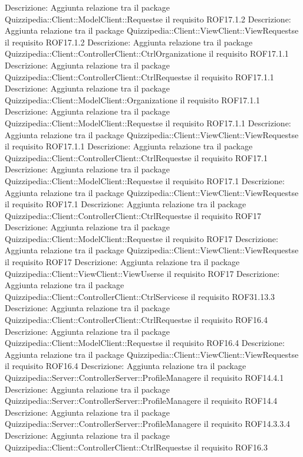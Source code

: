 Descrizione: Aggiunta relazione tra il package Quizzipedia::Client::ModelClient::Requestse il requisito ROF17.1.2 
Descrizione: Aggiunta relazione tra il package Quizzipedia::Client::ViewClient::ViewRequestse il requisito ROF17.1.2 
Descrizione: Aggiunta relazione tra il package Quizzipedia::Client::ControllerClient::CtrlOrganizatione il requisito ROF17.1.1 
Descrizione: Aggiunta relazione tra il package Quizzipedia::Client::ControllerClient::CtrlRequestse il requisito ROF17.1.1 
Descrizione: Aggiunta relazione tra il package Quizzipedia::Client::ModelClient::Organizatione il requisito ROF17.1.1 
Descrizione: Aggiunta relazione tra il package Quizzipedia::Client::ModelClient::Requestse il requisito ROF17.1.1 
Descrizione: Aggiunta relazione tra il package Quizzipedia::Client::ViewClient::ViewRequestse il requisito ROF17.1.1 
Descrizione: Aggiunta relazione tra il package Quizzipedia::Client::ControllerClient::CtrlRequestse il requisito ROF17.1 
Descrizione: Aggiunta relazione tra il package Quizzipedia::Client::ModelClient::Requestse il requisito ROF17.1 
Descrizione: Aggiunta relazione tra il package Quizzipedia::Client::ViewClient::ViewRequestse il requisito ROF17.1 
Descrizione: Aggiunta relazione tra il package Quizzipedia::Client::ControllerClient::CtrlRequestse il requisito ROF17 
Descrizione: Aggiunta relazione tra il package Quizzipedia::Client::ModelClient::Requestse il requisito ROF17 
Descrizione: Aggiunta relazione tra il package Quizzipedia::Client::ViewClient::ViewRequestse il requisito ROF17 
Descrizione: Aggiunta relazione tra il package Quizzipedia::Client::ViewClient::ViewUserse il requisito ROF17 
Descrizione: Aggiunta relazione tra il package Quizzipedia::Client::ControllerClient::CtrlServicese il requisito ROF31.13.3 
Descrizione: Aggiunta relazione tra il package Quizzipedia::Client::ControllerClient::CtrlRequestse il requisito ROF16.4 
Descrizione: Aggiunta relazione tra il package Quizzipedia::Client::ModelClient::Requestse il requisito ROF16.4 
Descrizione: Aggiunta relazione tra il package Quizzipedia::Client::ViewClient::ViewRequestse il requisito ROF16.4 
Descrizione: Aggiunta relazione tra il package Quizzipedia::Server::ControllerServer::ProfileManagere il requisito ROF14.4.1 
Descrizione: Aggiunta relazione tra il package Quizzipedia::Server::ControllerServer::ProfileManagere il requisito ROF14.4 
Descrizione: Aggiunta relazione tra il package Quizzipedia::Server::ControllerServer::ProfileManagere il requisito ROF14.3.3.4 
Descrizione: Aggiunta relazione tra il package Quizzipedia::Client::ControllerClient::CtrlRequestse il requisito ROF16.3 
